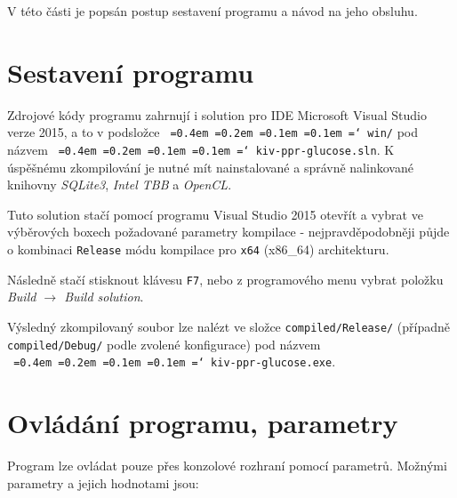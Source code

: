 \documentclass[]{thesiskiv}
\newcommand*\justify{
  \fontdimen2\font=0.4em
  \fontdimen3\font=0.2em
  \fontdimen4\font=0.1em
  \fontdimen7\font=0.1em
  \hyphenchar\font=`\-
}
\begin{document}
V této části je popsán postup sestavení programu a návod na jeho obsluhu. 

\section{Sestavení programu}

Zdrojové kódy programu zahrnují i solution pro IDE Microsoft Visual Studio verze 2015, a to v podsložce \texttt{\justify win/} pod názvem \texttt{\justify kiv-ppr-glucose.sln}. K úspěšnému zkompilování je nutné mít nainstalované a správně nalinkované knihovny \emph{SQLite3}, \emph{Intel TBB} a \emph{OpenCL}.

Tuto solution stačí pomocí programu Visual Studio 2015 otevřít a vybrat ve výběrových boxech požadované parametry kompilace - nejpravděpodobněji půjde o kombinaci \texttt{Release} módu kompilace pro \texttt{x64} (x86\_64) architekturu.

Následně stačí stisknout klávesu \texttt{F7}, nebo z programového menu vybrat položku \emph{Build $\rightarrow$ Build solution}.

Výsledný zkompilovaný soubor lze nalézt ve složce \texttt{compiled/Release/} (případně \texttt{compiled/Debug/} podle zvolené konfigurace) pod názvem\\ \texttt{\justify kiv-ppr-glucose.exe}.

\section{Ovládání programu, parametry}

Program lze ovládat pouze přes konzolové rozhraní pomocí parametrů. Možnými parametry a jejich hodnotami jsou:
\end{document}

